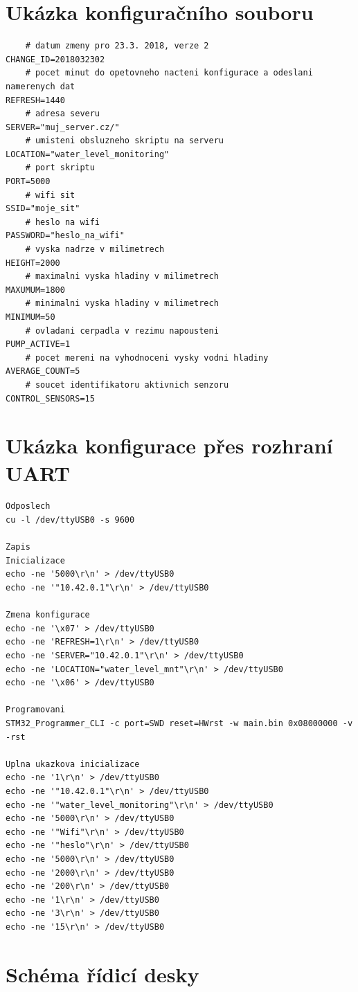 \chapter{Ukázka konfiguračního souboru}
	\label{sec:cfg}
	\begin{lstlisting}
    # datum zmeny pro 23.3. 2018, verze 2
CHANGE_ID=2018032302
    # pocet minut do opetovneho nacteni konfigurace a odeslani namerenych dat
REFRESH=1440
    # adresa severu
SERVER="muj_server.cz/"
    # umisteni obsluzneho skriptu na serveru
LOCATION="water_level_monitoring"
    # port skriptu
PORT=5000
    # wifi sit 
SSID="moje_sit"
    # heslo na wifi
PASSWORD="heslo_na_wifi"
    # vyska nadrze v milimetrech
HEIGHT=2000
    # maximalni vyska hladiny v milimetrech
MAXUMUM=1800
    # minimalni vyska hladiny v milimetrech
MINIMUM=50
    # ovladani cerpadla v rezimu napousteni
PUMP_ACTIVE=1
    # pocet mereni na vyhodnoceni vysky vodni hladiny
AVERAGE_COUNT=5
    # soucet identifikatoru aktivnich senzoru
CONTROL_SENSORS=15\end{lstlisting}

\chapter{Ukázka konfigurace přes rozhraní UART}
    \label{sec:cfg}
    \begin{lstlisting}
Odposlech
cu -l /dev/ttyUSB0 -s 9600

Zapis
Inicializace
echo -ne '5000\r\n' > /dev/ttyUSB0
echo -ne '"10.42.0.1"\r\n' > /dev/ttyUSB0

Zmena konfigurace
echo -ne '\x07' > /dev/ttyUSB0
echo -ne 'REFRESH=1\r\n' > /dev/ttyUSB0
echo -ne 'SERVER="10.42.0.1"\r\n' > /dev/ttyUSB0
echo -ne 'LOCATION="water_level_mnt"\r\n' > /dev/ttyUSB0
echo -ne '\x06' > /dev/ttyUSB0

Programovani
STM32_Programmer_CLI -c port=SWD reset=HWrst -w main.bin 0x08000000 -v -rst

Uplna ukazkova inicializace
echo -ne '1\r\n' > /dev/ttyUSB0
echo -ne '"10.42.0.1"\r\n' > /dev/ttyUSB0
echo -ne '"water_level_monitoring"\r\n' > /dev/ttyUSB0
echo -ne '5000\r\n' > /dev/ttyUSB0
echo -ne '"Wifi"\r\n' > /dev/ttyUSB0
echo -ne '"heslo"\r\n' > /dev/ttyUSB0
echo -ne '5000\r\n' > /dev/ttyUSB0
echo -ne '2000\r\n' > /dev/ttyUSB0
echo -ne '200\r\n' > /dev/ttyUSB0
echo -ne '1\r\n' > /dev/ttyUSB0
echo -ne '3\r\n' > /dev/ttyUSB0
echo -ne '15\r\n' > /dev/ttyUSB0\end{lstlisting}

\chapter{Schéma řídicí desky}
	\label{sec:main_board_scheme}
	

